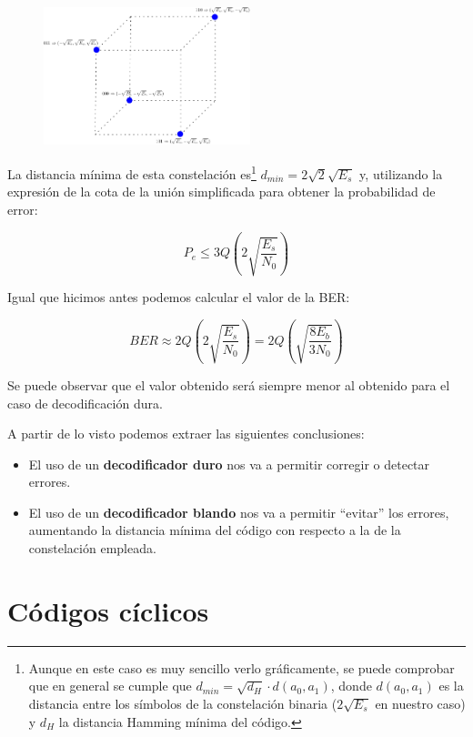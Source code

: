 \documentclass[es,apuntes]{uah}
\begin{document}
{\begin{figure}[h!]\centering\includegraphics[width=6cm]{./Figuras/DecodificadorBlando}\end{figure}

La distancia mínima de esta constelación es\footnote{Aunque en este caso es muy sencillo verlo gráficamente, se puede comprobar que en general se cumple que $d_{min} = \sqrt{d_H} \cdot d(a_0,a_1)$, donde $d(a_0,a_1)$ es la distancia entre los símbolos de la constelación binaria ($2\sqrt{E_s}$ en nuestro caso) y $d_H$ la distancia Hamming mínima del código.} $d_{min} = 2 \sqrt{2} \sqrt{E_s}$ y, utilizando la expresión de la cota de la unión simplificada para obtener la probabilidad de error:

\begin{displaymath}
	P_e \leq 3 Q \left ( 2 \sqrt{\frac{E_s}{N_0}} \right )
\end{displaymath}

Igual que hicimos antes podemos calcular el valor de la BER:

\begin{displaymath}
	BER \approx 2Q \left ( 2 \sqrt{\frac{E_s}{N_0}} \right ) = 2Q \left ( \sqrt{\frac{8 E_b}{3 N_0}} \right )
\end{displaymath}

Se puede observar que el valor obtenido será siempre menor al obtenido para el caso de decodificación dura.

A partir de lo visto podemos extraer las siguientes conclusiones:

\begin{itemize}
	\item El uso de un {\bf decodificador duro} nos va a permitir corregir o detectar errores.
	\item El uso de un {\bf decodificador blando} nos va a permitir ``evitar'' los errores, aumentando la distancia mínima del código con respecto a la de la constelación empleada.
\end{itemize}


\section{Códigos cíclicos}

}
\end{document}
